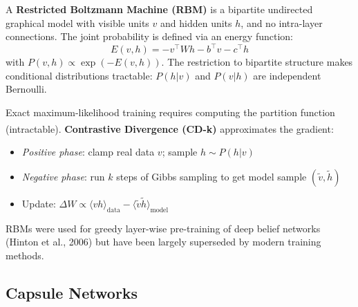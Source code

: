 \begin{tcbitemize}[ skin=sectionraster ]
    \tcbitem[title={Energy-Based Generative Model}, raster multicolumn=3]
    A \textbf{Restricted Boltzmann Machine (RBM)} is a bipartite undirected graphical model with visible units $v$ and hidden units $h$, and no intra-layer connections.
    The joint probability is defined via an energy function:
    \begin{equation}
        E(v, h) = -v^\top W h - b^\top v - c^\top h
    \end{equation}
    with $P(v, h) \propto \exp(-E(v,h))$.
    The restriction to bipartite structure makes conditional distributions tractable: $P(h|v)$ and $P(v|h)$ are independent Bernoulli.

    \tcbitem[title={Contrastive Divergence Training}, raster multicolumn=3]
    Exact maximum-likelihood training requires computing the partition function (intractable).
    \textbf{Contrastive Divergence (CD-k)} approximates the gradient\textsuperscript{\cite[][]{Kriesel2007NeuralNetworks}}:
    \begin{itemize}
        \item \emph{Positive phase}: clamp real data $v$; sample $h \sim P(h|v)$
        \item \emph{Negative phase}: run $k$ steps of Gibbs sampling to get model sample $(\tilde{v},\tilde{h})$
        \item Update: $\Delta W \propto \langle vh \rangle_\mathrm{data} - \langle \tilde{v}\tilde{h} \rangle_\mathrm{model}$
    \end{itemize}
    RBMs were used for greedy layer-wise pre-training of deep belief networks (Hinton et al., 2006) but have been largely superseded by modern training methods.
\end{tcbitemize}

\subsection{Capsule Networks}

